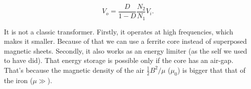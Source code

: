 	\begin{equation}
		V_o = \frac{D}{1-D}\frac{N_2}{N_1} V_i.
	\end{equation}
	
	It is not a classic transformer. Firstly, it operates at high frequencies, which makes it smaller. Because of that we can use a ferrite core instead of superposed magnetic sheets. Secondly, it also works as an energy limiter (as the self we used to have did). That energy storage is possible only if the core has an air-gap. That's because the magnetic density of the air $\frac{1}{2}B^2/\mu$ ($\mu _0$) is bigger that that of the iron ($\mu \gg$).
